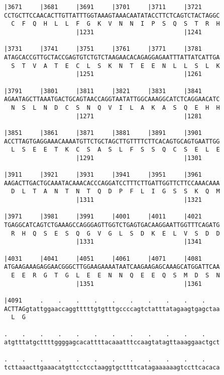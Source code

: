\documentclass{article}
\begin{document}
\newpage
\begin{Verbatim}[fontfamily=courier]
|3671     |3681     |3691     |3701     |3711     |3721     
CCTGCTTCCAACACTTGTTATTTGGTAAAGTAAACAATATACCTTCTCAGTCTACTAGGC
  C  F  Q  H  L  L  F  G  K  V  N  N  I  P  S  Q  S  T  R  H
                    |1231                         |1241     

|3731     |3741     |3751     |3761     |3771     |3781     
ATAGCACCGTTGCTACCGAGTGTCTGTCTAAGAACACAGAGGAGAATTTATTATCATTGA
  S  T  V  A  T  E  C  L  S  K  N  T  E  E  N  L  L  S  L  K
                    |1251                         |1261     

|3791     |3801     |3811     |3821     |3831     |3841     
AGAATAGCTTAAATGACTGCAGTAACCAGGTAATATTGGCAAAGGCATCTCAGGAACATC
  N  S  L  N  D  C  S  N  Q  V  I  L  A  K  A  S  Q  E  H  H
                    |1271                         |1281     

|3851     |3861     |3871     |3881     |3891     |3901     
ACCTTAGTGAGGAAACAAAATGTTCTGCTAGCTTGTTTTCTTCACAGTGCAGTGAATTGG
  L  S  E  E  T  K  C  S  A  S  L  F  S  S  Q  C  S  E  L  E
                    |1291                         |1301     

|3911     |3921     |3931     |3941     |3951     |3961     
AAGACTTGACTGCAAATACAAACACCCAGGATCCTTTCTTGATTGGTTCTTCCAAACAAA
  D  L  T  A  N  T  N  T  Q  D  P  F  L  I  G  S  S  K  Q  M
                    |1311                         |1321     

|3971     |3981     |3991     |4001     |4011     |4021     
TGAGGCATCAGTCTGAAAGCCAGGGAGTTGGTCTGAGTGACAAGGAATTGGTTTCAGATG
  R  H  Q  S  E  S  Q  G  V  G  L  S  D  K  E  L  V  S  D  D
                    |1331                         |1341     

|4031     |4041     |4051     |4061     |4071     |4081     
ATGAAGAAAGAGGAACGGGCTTGGAAGAAAATAATCAAGAAGAGCAAAGCATGGATTCAA
  E  E  R  G  T  G  L  E  E  N  N  Q  E  E  Q  S  M  D  S  N
                    |1351                         |1361     

|4091     .    .    .    .    .    .    .    .    .    .    
ACTTAGgtattggaaccaggtttttgtgtttgccccagtctatttatagaagtgagctaa
  L  G                                                      

.    .    .    .    .    .    .    .    .    .    .    .    
atgtttatgcttttggggagcacattttacaaatttccaagtatagttaaaggaactgct

.    .    .    .    .    .    .    .    .    .    .    .    
tcttaaacttgaaacatgttcctcctaaggtgcttttcatagaaaaaagtccttcacaca

\end{Verbatim}
\end{document}
